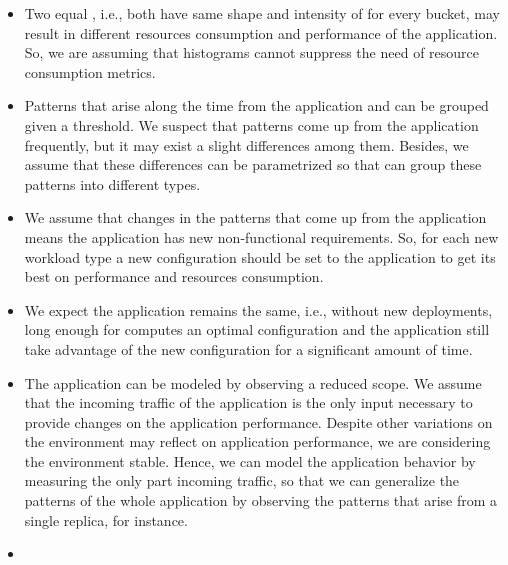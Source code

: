 \begin{itemize}
  \item Two equal , i.e., both have same shape and intensity of for every bucket, may
    result in different resources consumption and performance of the
    application. So, we are assuming that histograms cannot suppress the need of
    resource consumption metrics.

\item Patterns that arise along the time from the application and can be grouped
  given a threshold. We suspect that patterns come up from the application
    frequently, but it may exist a slight differences among them. Besides, we
    assume that these differences can be parametrized so that \name can group
    these patterns into different types.  

\item We assume that changes in the patterns that come up from the application
  means the application has new non-functional requirements. So, for each new
    workload type a new configuration should be set to the application to get
    its best on performance and resources consumption. 

\item We expect the application remains the same, i.e., without new deployments,
  long enough for \name computes an optimal configuration and the application
    still take advantage of the new configuration for a significant amount of
    time.

\item The application can be modeled by observing a reduced scope. We assume
  that the incoming traffic of the application is the only input necessary to
    provide changes on the application performance. Despite other variations on
    the environment may reflect on application performance, we are considering
    the environment stable. Hence, we can model the application behavior by
    measuring the only part incoming traffic, so that we can generalize the
    patterns of the whole application by observing the patterns that arise from
    a single replica, for instance. 

  \item {}

\end{itemize}

